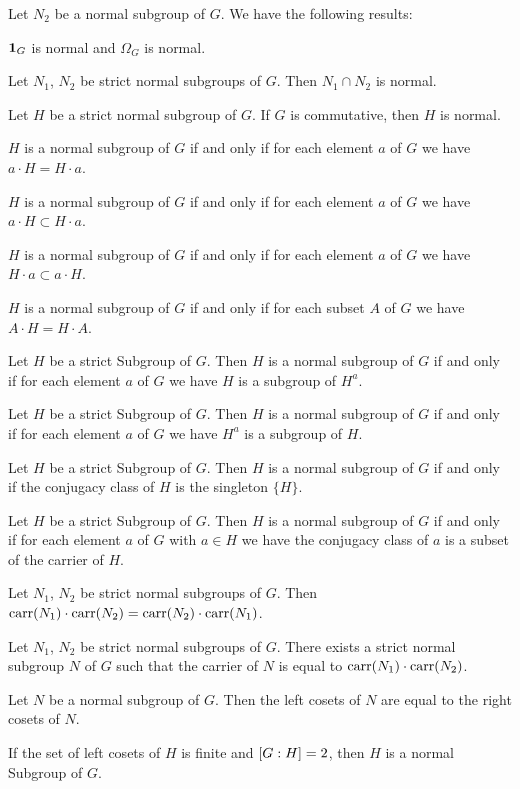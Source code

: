 \documentclass{article}
\begin{document}
Let $N_{2}$ be a normal subgroup of $G$. We have the following results:
\begin{thm}
\item\label{group3:114} $\mathbf{1}_{G}$ is normal and $\Omega_{G}$
  is normal.
\item\label{group3:115} Let $N_{1}$, $N_{2}$ be strict normal subgroups of $G$.
  Then $N_{1}\cap N_{2}$ is normal.
\item\label{group3:116} Let $H$ be a strict normal subgroup of $G$. If
  $G$ is commutative, then $H$ is normal.
\item\label{group3:117} $H$ is a normal subgroup of $G$ if and only if
  for each element $a$ of $G$ we have $a\cdot H=H\cdot a$.
\item\label{group3:118} $H$ is a normal subgroup of $G$ if and only if
  for each element $a$ of $G$ we have $a\cdot H\subset H\cdot a$.
\item\label{group3:119} $H$ is a normal subgroup of $G$ if and only if
  for each element $a$ of $G$ we have $H\cdot a\subset a\cdot H$.
\item\label{group3:120} $H$ is a normal subgroup of $G$ if and only if
  for each subset $A$ of $G$ we have $A\cdot H=H\cdot A$.
\item\label{group3:121} Let $H$ be a strict Subgroup of $G$. Then $H$ is
  a normal subgroup of $G$ if and only if for each element $a$ of $G$ we
  have $H$ is a subgroup of $H^{a}$.
\item\label{group3:122} Let $H$ be a strict Subgroup of $G$. Then $H$ is
  a normal subgroup of $G$ if and only if for each element $a$ of $G$ we
  have $H^{a}$ is a subgroup of $H$.
\item\label{group3:123} Let $H$ be a strict Subgroup of $G$. Then $H$ is
  a normal subgroup of $G$ if and only if the conjugacy class of $H$ is
  the singleton $\{H\}$.
\item\label{group3:124} Let $H$ be a strict Subgroup of $G$. Then $H$ is
  a normal subgroup of $G$ if and only if for each element $a$ of $G$
  with $a\in H$ we have the conjugacy class of $a$ is a subset of the
  carrier of $H$.
\item\label{group3:125} Let $N_{1}$, $N_{2}$ be strict normal subgroups
  of $G$. Then $\operatorname{carr}(N_{1})\cdot\operatorname{carr}(N_{2})=\operatorname{carr}(N_{2})\cdot\operatorname{carr}(N_{1})$.
\item\label{group3:126} Let $N_{1}$, $N_{2}$ be strict normal subgroups
  of $G$. There exists a strict normal subgroup $N$ of $G$ such that the
  carrier of $N$ is equal to $\operatorname{carr}(N_{1})\cdot\operatorname{carr}(N_{2})$.
\item\label{group3:127} Let $N$ be a normal subgroup of $G$. Then the
  left cosets of $N$ are equal to the right cosets of $N$.
\item\label{group3:128} If the set of left cosets of $H$ is finite and
  $[G : H]=2$, then $H$ is a normal Subgroup of $G$.
\end{thm}
\end{document}
